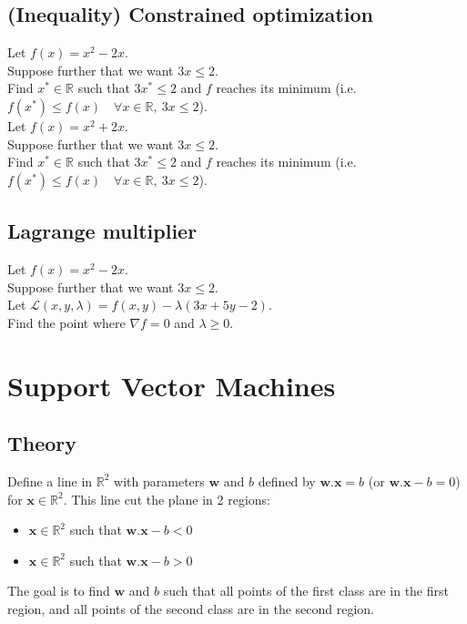 \documentclass[]{article}
\newcommand{\R}{\mathbb{R}}
\begin{document}
	\subsection{(Inequality) Constrained optimization}
	Let $f(x) = x^2-2x$.\\
	Suppose further that we want $3x \leq 2$.\\
	Find $x^* \in \R$ such that $3x^* \leq 2$ and $f$ reaches its minimum (i.e. $f(x^*) \leq f(x) \quad \forall x \in \R,\ 3x \leq 2$).
	\vspace{0.5cm}
	\\
	Let $f(x) = x^2+2x$.\\
	Suppose further that we want $3x \leq 2$.\\
	Find $x^* \in \R$ such that $3x^* \leq 2$ and $f$ reaches its minimum (i.e. $f(x^*) \leq f(x) \quad \forall x \in \R,\ 3x \leq 2$).
	
	\subsection{Lagrange multiplier}
	Let $f(x) = x^2-2x$.\\
	Suppose further that we want $3x \leq 2$.\\
	Let $\mathcal{L}(x,y,\lambda) = f(x,y) - \lambda (3x + 5y -2)$.\\
	Find the point where $\nabla f = 0$ and $\lambda \geq 0$.
	
	\section{Support Vector Machines}
	\subsection{Theory}
	Define a line in $\R^2$ with parameters $\mathbf{w}$ and $b$ defined by $\mathbf{w}.\mathbf{x} = b$ (or $\mathbf{w}.\mathbf{x} - b = 0$) for $\mathbf{x} \in \R^2$.
	This line cut the plane in 2 regions:
	\begin{itemize}
		\item $\mathbf{x} \in \R^2$ such that $\mathbf{w}.\mathbf{x} - b < 0$
		\item $\mathbf{x} \in \R^2$ such that $\mathbf{w}.\mathbf{x} - b > 0$
	\end{itemize}
	The goal is to find $\mathbf{w}$ and $b$ such that all points of the first class are in the first region, and all points of the second class are in the second region.
	
	
	
\end{document}
